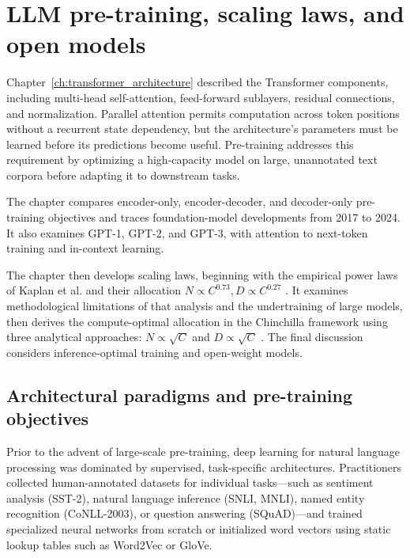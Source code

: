 \documentclass[../../main.tex]{subfiles}
\begin{document}
\chapter{LLM pre-training, scaling laws, and open models}
\label{ch:scaling_laws_pretraining}

Chapter~\ref{ch:transformer_architecture} described the Transformer components, including multi-head self-attention, feed-forward sublayers, residual connections, and normalization. Parallel attention permits computation across token positions without a recurrent state dependency, but the architecture's parameters must be learned before its predictions become useful. Pre-training addresses this requirement by optimizing a high-capacity model on large, unannotated text corpora before adapting it to downstream tasks.

The chapter compares encoder-only, encoder-decoder, and decoder-only pre-training objectives and traces foundation-model developments from 2017 to 2024. It also examines GPT-1, GPT-2, and GPT-3, with attention to next-token training and in-context learning.

The chapter then develops scaling laws, beginning with the empirical power laws of Kaplan et al. and their allocation $N \propto C^{0.73}, D \propto C^{0.27}$ \cite{kaplan2020}. It examines methodological limitations of that analysis and the undertraining of large models, then derives the compute-optimal allocation in the Chinchilla framework using three analytical approaches: $N \propto \sqrt{C}$ and $D \propto \sqrt{C}$ \cite{hoffmann2022}. The final discussion considers inference-optimal training and open-weight models.

\section{Architectural paradigms and pre-training objectives}
\label{sec:architectural_fork}

Prior to the advent of large-scale pre-training, deep learning for natural language processing was dominated by supervised, task-specific architectures. Practitioners collected human-annotated datasets for individual tasks---such as sentiment analysis (SST-2), natural language inference (SNLI, MNLI), named entity recognition (CoNLL-2003), or question answering (SQuAD)---and trained specialized neural networks from scratch or initialized word vectors using static lookup tables such as Word2Vec or GloVe. 
\end{document}
